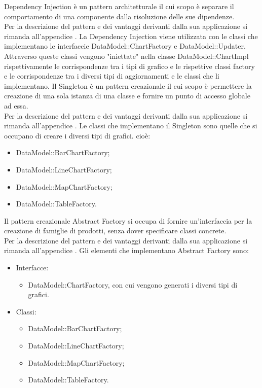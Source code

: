	Dependency Injection è un pattern architetturale il cui scopo è separare il comportamento di una componente dalla risoluzione delle sue dipendenze.\\
	Per la descrizione del pattern e dei vantaggi derivanti dalla sua applicazione si rimanda all'appendice .
	La Dependency Injection viene utilizzata con le classi che implementano le interfaccie DataModel::ChartFactory e DataModel::Updater. Attraverso queste classi vengono "iniettate" nella classe DataModel::ChartImpl rispettivamente le corrispondenze tra i tipi di grafico e le rispettive classi factory e le corrispondenze tra i diversi tipi di aggiornamenti e le classi che li implementano.
	Il Singleton è un pattern creazionale il cui scopo è permettere la creazione di una sola istanza di una classe e fornire un punto di accesso globale ad essa.\\
	Per la descrizione del pattern e dei vantaggi derivanti dalla sua applicazione si rimanda all'appendice .
	Le classi che implementano il Singleton sono quelle che si occupano di creare i diversi tipi di grafici. cioè:
	\begin{itemize}
	\item DataModel::BarChartFactory;
	\item DataModel::LineChartFactory;
	\item DataModel::MapChartFactory;
	\item DataModel::TableFactory.
	\end{itemize}
	Il pattern creazionale Abstract Factory si occupa di fornire un'interfaccia per la creazione di famiglie di prodotti, senza dover specificare classi concrete. \\
	Per la descrizione del pattern e dei vantaggi derivanti dalla sua applicazione si rimanda all'appendice .
	Gli elementi che implementano Abstract Factory sono:
	\begin{itemize}
	\item Interfacce:
		\begin{itemize}
			\item DataModel::ChartFactory, con cui vengono generati i diversi tipi di grafici.
		\end{itemize}
	\item Classi:
		\begin{itemize}
			\item DataModel::BarChartFactory;
			\item DataModel::LineChartFactory;
			\item DataModel::MapChartFactory;
			\item DataModel::TableFactory.
		\end{itemize}
	\end{itemize}
